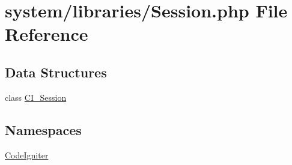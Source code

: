 \hypertarget{_session_8php}{\section{system/libraries/\-Session.php File Reference}
\label{_session_8php}
}
\subsection*{Data Structures}
\begin{DoxyCompactItemize}
\item 
class \hyperlink{class_c_i___session}{C\-I\-\_\-\-Session}
\end{DoxyCompactItemize}
\subsection*{Namespaces}
\begin{DoxyCompactItemize}
\item 
\hyperlink{namespace_code_igniter}{Code\-Igniter}
\end{DoxyCompactItemize}
